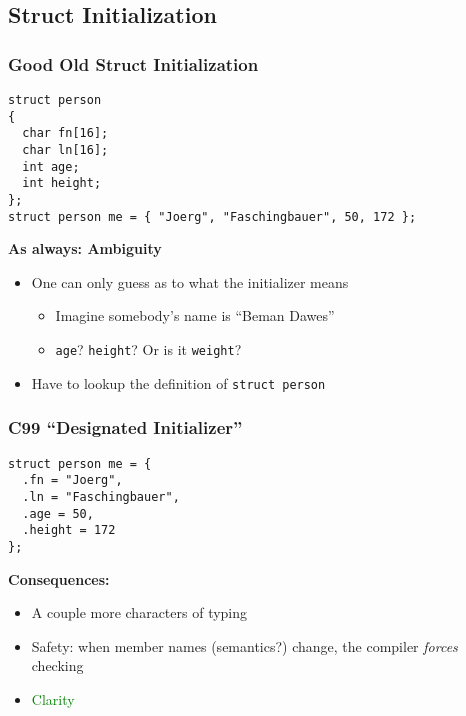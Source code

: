 \subsection{Struct Initialization}

\begin{frame}[fragile]
  \frametitle{Good Old Struct Initialization}

  \begin{block}{}
\begin{verbatim}
struct person
{
  char fn[16];
  char ln[16];
  int age;
  int height;
};
struct person me = { "Joerg", "Faschingbauer", 50, 172 };
\end{verbatim}
  \end{block}

  \textbf{As always: Ambiguity}

  \begin{itemize}
  \item One can only guess as to what the initializer means
    \begin{itemize}
    \item Imagine somebody's name is ``Beman Dawes''
    \item \texttt{age}? \texttt{height}? Or is it \texttt{weight}?
    \end{itemize}
  \item Have to lookup the definition of \texttt{struct person}
  \end{itemize}

\end{frame}

\begin{frame}[fragile]
  \frametitle{C99 ``Designated Initializer''}

  \begin{block}{}
\begin{verbatim}
struct person me = {
  .fn = "Joerg",
  .ln = "Faschingbauer",
  .age = 50,
  .height = 172
};
\end{verbatim}
  \end{block}

  \textbf{Consequences:}

  \begin{itemize}
  \item A couple more characters of typing
  \item Safety: when member names (semantics?) change, the compiler
    \textit{forces} checking
  \item \textcolor{green}{Clarity}
  \end{itemize}

\end{frame}
